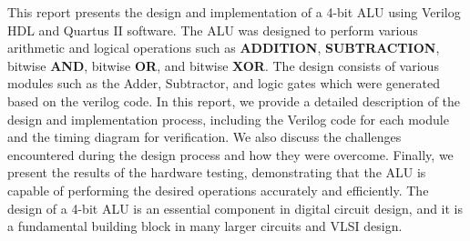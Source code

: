 This report presents the design and implementation of a
4-bit ALU using Verilog HDL and Quartus II software.
The ALU was designed to perform various arithmetic
and logical operations such as \textbf{ADDITION}, \textbf{SUBTRACTION},
bitwise \textbf{AND}, bitwise \textbf{OR}, and bitwise \textbf{XOR}.
The design consists of various modules such as the Adder, Subtractor,
and logic gates which were generated based on the verilog code.
In this report, we provide a detailed description of the design and implementation process,
including the Verilog code for each module and the timing diagram for verification.
We also discuss the challenges encountered during the design process and how they were overcome.
Finally, we present the results of the hardware testing, demonstrating that
the ALU is capable of performing the desired operations accurately and efficiently.
The design of a 4-bit ALU is an essential component in digital circuit design,
and it is a fundamental building block in many larger circuits and VLSI design.